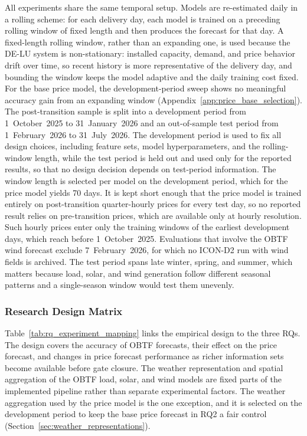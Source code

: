 All experiments share the same temporal setup. Models are re-estimated daily
in a rolling scheme: for each delivery day, each model is trained on a preceding
rolling window of fixed length and then produces the forecast for that day. A
fixed-length rolling window, rather than an expanding one, is used because the
\mbox{DE-LU} system is non-stationary: installed capacity, demand, and price behavior
drift over time, so recent history is more representative of the delivery day,
and bounding the window keeps the model adaptive and the daily training cost
fixed. For the base price model, the development-period sweep shows no
meaningful accuracy gain from an expanding window
(Appendix~\ref{app:price_base_selection}). The
post-transition sample is split into a development period from
1~October~2025 to 31~January~2026 and an out-of-sample test period from
1~February~2026 to 31~July~2026. The development period is used to fix all
design choices, including feature sets, model hyperparameters, and the
rolling-window length, while the test period is held out and used only for the
reported results, so that no design decision depends on test-period
information. The window length is selected per model on the development period,
which for the price model yields 70 days. It is kept short enough that the
price model is trained entirely on post-transition quarter-hourly prices for
every test day, so no reported result relies on pre-transition prices, which are
available only at hourly resolution. Such hourly prices enter only the training
windows of the earliest development days, which reach before 1~October~2025. Evaluations that involve the OBTF wind forecast exclude 7~February~2026, for which no \mbox{ICON-D2} run with wind
fields is archived. The test period spans late winter, spring, and summer, which
matters because load, solar, and wind generation follow different
seasonal patterns and a single-season window would test them unevenly.

\subsubsection{Research Design Matrix}
\label{sec:rq_experiment_mapping}

Table~\ref{tab:rq_experiment_mapping} links the empirical design to the
three RQs. The design covers the accuracy of OBTF forecasts,
their effect on the price forecast, and changes in price forecast performance
as richer information sets become available before gate closure.
The weather representation and spatial aggregation of the OBTF load, solar, and wind models are fixed parts of the implemented pipeline rather than separate
experimental factors. The weather aggregation used by the price model is the one exception,
and it is selected on the development period to keep the base price forecast
in RQ2 a fair control (Section~\ref{sec:weather_representations}).

